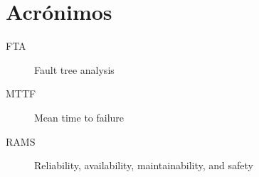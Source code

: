 
\chapter{Acrónimos}
\begin{description}
\item[FTA] Fault tree analysis
\item[MTTF] Mean time to failure
\item[RAMS] Reliability, availability, maintainability, and safety
\end{description}